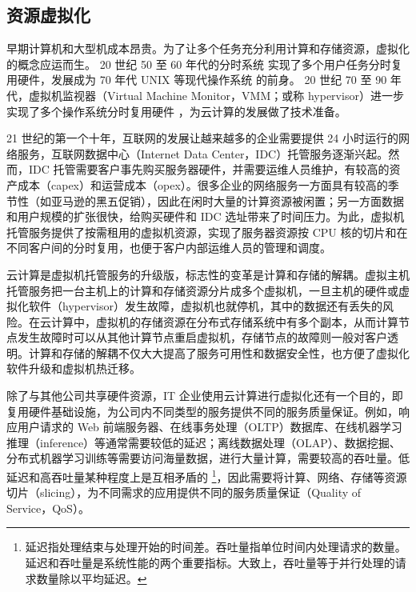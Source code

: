 \subsection{资源虚拟化}
\label{background:sec:datacenter-virtualization}

早期计算机和大型机成本昂贵。为了让多个任务充分利用计算和存储资源，虚拟化的概念应运而生。
20 世纪 50 至 60 年代的分时系统 \cite{strachey1959time,amdahl1964architecture} 实现了多个用户任务分时复用硬件，发展成为 70 年代 UNIX 等现代操作系统 \cite{bach1986design} 的前身。
20 世纪 70 至 90 年代，虚拟机监视器（Virtual Machine Monitor，VMM；或称 hypervisor）进一步实现了多个操作系统分时复用硬件 \cite{popek1974formal,agesen2010evolution}，为云计算的发展做了技术准备。



21 世纪的第一个十年，互联网的发展让越来越多的企业需要提供 24 小时运行的网络服务，互联网数据中心（Internet Data Center，IDC）托管服务逐渐兴起。然而，IDC 托管需要客户事先购买服务器硬件，并需要运维人员维护，有较高的资产成本（capex）和运营成本（opex）。很多企业的网络服务一方面具有较高的季节性（如亚马逊的黑五促销），因此在闲时大量的计算资源被闲置；另一方面数据和用户规模的扩张很快，给购买硬件和 IDC 选址带来了时间压力。为此，虚拟机托管服务提供了按需租用的虚拟机资源，实现了服务器资源按 CPU 核的切片和在不同客户间的分时复用，也便于客户内部运维人员的管理和调度。

云计算是虚拟机托管服务的升级版，标志性的变革是计算和存储的解耦。虚拟主机托管服务把一台主机上的计算和存储资源分片成多个虚拟机，一旦主机的硬件或虚拟化软件（hypervisor）发生故障，虚拟机也就停机，其中的数据还有丢失的风险。在云计算中，虚拟机的存储资源在分布式存储系统中有多个副本，从而计算节点发生故障时可以从其他计算节点重启虚拟机，存储节点的故障则一般对客户透明。计算和存储的解耦不仅大大提高了服务可用性和数据安全性，也方便了虚拟化软件升级和虚拟机热迁移。

除了与其他公司共享硬件资源，IT 企业使用云计算进行虚拟化还有一个目的，即复用硬件基础设施，为公司内不同类型的服务提供不同的服务质量保证。例如，响应用户请求的 Web 前端服务器、在线事务处理（OLTP）数据库、在线机器学习推理（inference）等通常需要较低的延迟；离线数据处理（OLAP）、数据挖掘、分布式机器学习训练等需要访问海量数据，进行大量计算，需要较高的吞吐量。低延迟和高吞吐量某种程度上是互相矛盾的 \footnote{延迟指处理结束与处理开始的时间差。吞吐量指单位时间内处理请求的数量。延迟和吞吐量是系统性能的两个重要指标。大致上，吞吐量等于并行处理的请求数量除以平均延迟。}，因此需要将计算、网络、存储等资源切片（slicing），为不同需求的应用提供不同的服务质量保证（Quality of Service，QoS）。


